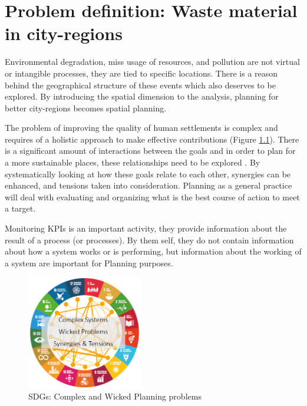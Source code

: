 \chapter{Problem definition: Waste material in city-regions}

Environmental degradation, miss usage of resources, and pollution are not virtual or intangible processes, they are tied to specific locations. There is a reason behind the geographical structure of these events which also deserves to be explored. By introducing the spatial dimension to the analysis, planning for better city-regions becomes spatial planning. \par

The problem of improving the quality of human settlements is complex and requires of a holistic approach to make effective contributions (Figure \ref{fig:complex_sdg}). There is a significant amount of interactions between the goals and in order to plan for a more sustainable places, these relationships need to be explored \parencite{Eurostat2019, Miola2019,euc2019}. By systematically looking at how these goals relate to each other, synergies can be enhanced, and tensions taken into consideration. Planning as a general practice will deal with evaluating and organizing what is the best course of action to meet a target. \par
%
Monitoring KPIs is an important activity, they provide information about the result of a process (or processes). By them self, they do not contain information about how a system works or is performing, but information about the working of a system are important for Planning purposes. \par
%


\begin{figure}[hbt!]
    \centering
    \includegraphics[width=0.45\textwidth]{sections/asset/3_complex.PNG}
    \caption{SDGs: Complex and Wicked Planning problems \parencite[pp. 30]{Eurostat2019}}
    \label{fig:complex_sdg}
\end{figure}
%


